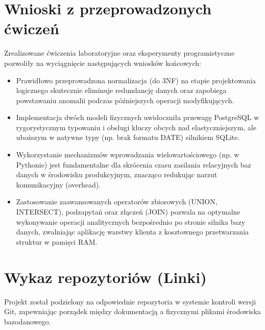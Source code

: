 \documentclass[a4paper,11pt,english,openany,oneside]{sphinxmanual}
\begin{document}
\section{Wnioski z przeprowadzonych ćwiczeń}
\label{\detokenize{rozdzial_1/index:wnioski-z-przeprowadzonych-cwiczen}}
\sphinxAtStartPar
Zrealizowane ćwiczenia laboratoryjne oraz eksperymenty programistyczne pozwoliły na wyciągnięcie następujących wniosków końcowych:
\begin{itemize}
\item {} 
\sphinxAtStartPar
{} Prawidłowo przeprowadzona normalizacja (do 3NF) na etapie projektowania logicznego skutecznie eliminuje redundancję danych oraz zapobiega powstawaniu anomalii podczas późniejszych operacji modyfikujących.

\item {} 
\sphinxAtStartPar
{} Implementacja dwóch modeli fizycznych uwidoczniła przewagę PostgreSQL w rygorystycznym typowaniu i obsługi kluczy obcych nad elastyczniejszym, ale uboższym w natywne typy (np. brak formatu DATE) silnikiem SQLite.

\item {} 
\sphinxAtStartPar
{} Wykorzystanie mechanizmów wprowadzania wielowartościowego (np.  w Pythonie) jest fundamentalne dla skrócenia czasu zasilania relacyjnych baz danych w środowisku produkcyjnym, znacząco redukując narzut komunikacyjny (overhead).

\item {} 
\sphinxAtStartPar
{} Zastosowanie zaawansowanych operatorów zbiorowych (UNION, INTERSECT), podzapytań oraz złączeń (JOIN) pozwala na optymalne wykonywanie operacji analitycznych bezpośrednio po stronie silnika bazy danych, zwalniając aplikację warstwy klienta z kosztownego przetwarzania struktur w pamięci RAM.

\end{itemize}


\section{Wykaz repozytoriów (Linki)}
\label{\detokenize{rozdzial_1/index:wykaz-repozytoriow-linki}}
\sphinxAtStartPar
Projekt został podzielony na odpowiednie repozytoria w systemie kontroli wersji Git, zapewniając porządek między dokumentacją a fizycznymi plikami środowiska bazodanowego.
\end{document}
